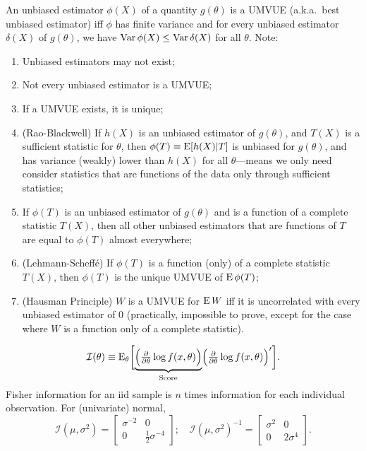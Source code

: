 \documentclass[8pt,letterpaper, landscape]{extarticle} %
\renewcommand{\ln}{\log}
\begin{document}
\begin{multicols}{3}
\begin{description}
 An unbiased estimator $ \phi (X) $ of a quantity $ g(\theta) $ is a UMVUE (a.k.a.\ best unbiased estimator) iff $ \phi $ has finite variance and for every unbiased estimator $ \delta (X) $ of $ g(\theta) $, we have $ \operatorname{Var} \phi (X) \leq \operatorname{Var} \delta (X) $ for all $ \theta $. Note:
\begin{enumerate}
\item Unbiased estimators may not exist;
\item Not every unbiased estimator is a UMVUE;
\item If a UMVUE exists, it is unique;
\item (Rao-Blackwell) If $ h(X) $ is an unbiased estimator of $ g(\theta) $, and $ T(X) $ is a sufficient statistic for $ \theta $, then $ \phi(T) \equiv \operatorname{E} [h(X)|T] $ is unbiased for $ g(\theta) $, and has variance (weakly) lower than $ h(X) $ for all $ \theta $---means we only need consider statistics that are functions of the data only through sufficient statistics;
\item If $ \phi(T) $ is an unbiased estimator of $ g(\theta) $ and is a function of a complete statistic $ T(X) $, then all other unbiased estimators that are functions of $ T $ are equal to $ \phi(T) $ almost everywhere;
\item (Lehmann-Scheff\'{e}) If $ \phi(T) $ is a function (only) of a complete statistic $ T(X) $, then $ \phi(T) $ is the unique UMVUE of $ \operatorname{E} \phi(T) $;
\item (Hausman Principle) $ W $ is a UMVUE for $ \operatorname{E} W $ iff it is uncorrelated with every unbiased estimator of $ 0 $ (practically, impossible to prove, except for the case where $ W $ is a function only of a complete statistic).
\end{enumerate}

$$ \mathcal{I}(\theta) \equiv \E_\theta \biggl [ \underbrace{ \Bigl ( \tfrac{\partial}{\partial \theta} \ln f(x, \theta ) \Bigr )}_{\text{Score}}  \Bigl ( \tfrac{\partial}{\partial \theta} \ln f(x, \theta) \Bigr )' \biggr ]. $$
Fisher information for an iid sample is $ n $ times information for each individual observation. For (univariate) normal,
$$ \mathcal{I}(\mu, \sigma^2) =  \begin{bmatrix}
\sigma^{-2} & 0 \\
0 & \frac{1}{2} \sigma^{-4}
\end{bmatrix} ; \quad
\mathcal{I}(\mu, \sigma^2)^{-1} =  \begin{bmatrix}
\sigma^{2} & 0 \\
0 & 2 \sigma^{4}
\end{bmatrix} . $$


\end{description}
\end{multicols}
\end{document}
